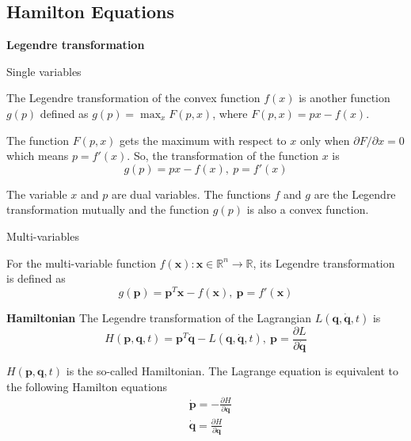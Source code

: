 
\subsection{Hamilton Equations}

\noindent\textbf{Legendre transformation}

\noindent Single variables

    The Legendre transformation of the convex function $f(x)$ is another function $g(p)$ defined as 
    $g(p)=\max_{x}F(p,x)$, where $F(p,x)=px-f(x)$.

The function $F(p,x)$ gets the maximum with respect to $x$ only when $\partial F/\partial x =0$ 
which means $p = f'(x)$. So, the transformation of the function $x$ is 
\begin{equation}
        g(p) = px-f(x),\ p=f'(x)
\end{equation}

The variable $x$ and $p$ are dual variables. The functions $f$ and $g$ are the Legendre transformation mutually and 
the function $g(p)$ is also a convex function.

\noindent Multi-variables

For the multi-variable function $f(\mathbf{x}):\mathbf{x}\in \mathbb{R}^{n}\rightarrow \mathbb{R}$, 
its Legendre transformation is defined as 
\begin{equation}
        g(\mathbf{p}) = \mathbf{p}^{T}\mathbf{x}-f(\mathbf{x}),\ \mathbf{p}=f'(\mathbf{x})
\end{equation}

\noindent \textbf{Hamiltonian}
The Legendre transformation of the Lagrangian $L(\mathbf{q},\dot{\mathbf{q}},t)$ is  
\begin{equation}
    H(\mathbf{p},\mathbf{q},t)=\mathbf{p}^{T}\dot{\mathbf{q}}-L(\mathbf{q},\dot{\mathbf{q}},t),\ \mathbf{p}=\frac{\partial L}{\partial \dot{\mathbf{q}}}
\end{equation}

$H(\mathbf{p},\mathbf{q},t)$ is the so-called Hamiltonian. 
The Lagrange equation is equivalent to the following Hamilton equations 
\begin{equation}
    \begin{aligned}
        &\dot{\mathbf{p}} = -\frac{\partial H}{\partial \mathbf{q}} \\
        &\dot{\mathbf{q}} = \frac{\partial H}{\partial \mathbf{q}}
    \end{aligned}
\end{equation}

